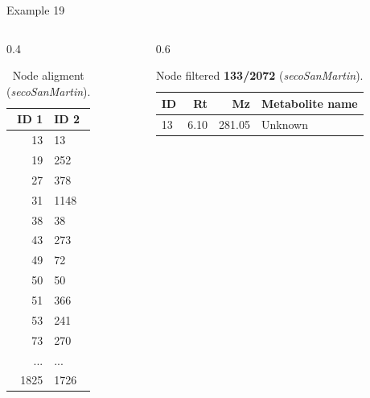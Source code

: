 \documentclass[aspectratio=169]{beamer}
\begin{document}
    \begin{frame}{Example 19}
        \begin{columns}[t] %
            \begin{column}{0.4\textwidth}
                \begin{table}[htp!]
                    \scriptsize
                    \centering
                    \caption{Node aligment (\textit{secoSanMartin}).}
                    \begin{tabular}{rl}\toprule
                        ID 1 & ID 2 \\\midrule
                        \rowcolor{yellow}
                        13 & 13 \\
                        19 & 252 \\
                        27 & 378 \\
                        31 & 1148 \\
                        \rowcolor{yellow}
                        38 & 38 \\
                        43 & 273 \\
                        49 & 72 \\
                        \rowcolor{yellow}
                        50 & 50 \\
                        51 & 366 \\
                        53 & 241 \\
                        73 & 270 \\
                        ... & ... \\
                        1825 & 1726 \\\bottomrule
                    \end{tabular}
                \end{table}
            \end{column}
            \begin{column}{0.6\textwidth}
                \begin{table}[htp!]
                    \scriptsize
                    \centering
                    \caption{Node filtered \textbf{133/2072} (\textit{secoSanMartin}).}
                    \begin{tabular}{lrrl}\toprule
                        ID & Rt & Mz & Metabolite name \\\midrule
                        13 & 6.10 & 281.05 & Unknown \\

\end{tabular}
\end{table}
\end{column}
\end{columns}
\end{frame}
\end{document}
